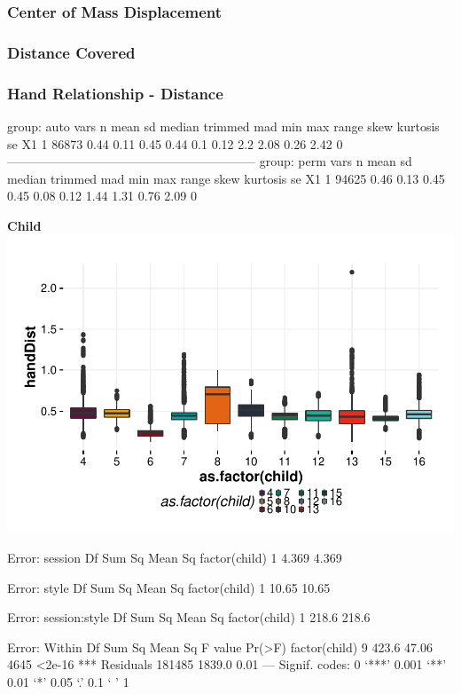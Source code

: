 \documentclass{article}
\begin{document}
\subsubsection{Center of Mass Displacement}

\subsubsection{Distance Covered}

\subsubsection{Hand Relationship - Distance}
\begin{Schunk}
\begin{Soutput}
group: auto
   vars     n mean   sd median trimmed mad  min max range skew kurtosis se
X1    1 86873 0.44 0.11   0.45    0.44 0.1 0.12 2.2  2.08 0.26     2.42  0
------------------------------------------------------------ 
group: perm
   vars     n mean   sd median trimmed  mad  min  max range skew kurtosis se
X1    1 94625 0.46 0.13   0.45    0.45 0.08 0.12 1.44  1.31 0.76     2.09  0
\end{Soutput}
\end{Schunk}


\textbf{Child}
\includegraphics{features-plot_handdistance_child_quiz}

\begin{Schunk}
\begin{Soutput}
Error: session
              Df Sum Sq Mean Sq
factor(child)  1  4.369   4.369

Error: style
              Df Sum Sq Mean Sq
factor(child)  1  10.65   10.65

Error: session:style
              Df Sum Sq Mean Sq
factor(child)  1  218.6   218.6

Error: Within
                  Df Sum Sq Mean Sq F value Pr(>F)    
factor(child)      9  423.6   47.06    4645 <2e-16 ***
Residuals     181485 1839.0    0.01                   
---
Signif. codes:  0 ‘***’ 0.001 ‘**’ 0.01 ‘*’ 0.05 ‘.’ 0.1 ‘ ’ 1
\end{Soutput}
\end{Schunk}
\end{document}
